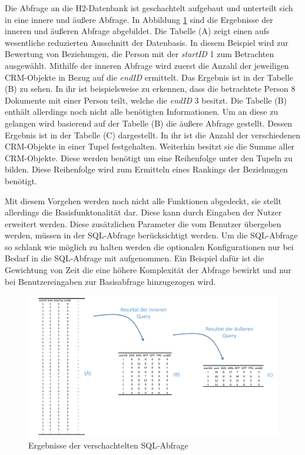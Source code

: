 Die Abfrage an die H2-Datenbank ist geschachtelt aufgebaut und unterteilt sich in eine innere und äußere Abfrage. In Abbildung \ref{umsetzung_sql} sind die Ergebnisse der inneren und äußeren Abfrage abgebildet. Die Tabelle (A) zeigt einen aufs wesentliche reduzierten Ausschnitt der Datenbasis. In diesem Beispiel wird zur Bewertung von Beziehungen, die Person mit der \textit{startID} 1 zum Betrachten ausgewählt. Mithilfe der inneren Abfrage wird zuerst die Anzahl der jeweiligen CRM-Objekte in Bezug auf die \textit{endID} ermittelt. Das Ergebnis ist in der Tabelle (B) zu sehen. In ihr ist beispielsweise zu erkennen, dass die betrachtete Person 8 Dokumente mit einer Person teilt, welche die \textit{endID} 3 besitzt. Die Tabelle (B) enthält allerdings noch nicht alle benötigten Informationen. Um an diese zu gelangen wird basierend auf der Tabelle (B)  die äußere Abfrage gestellt. Dessen Ergebnis ist in der Tabelle (C) dargestellt. In ihr ist die Anzahl der verschiedenen CRM-Objekte in einer Tupel festgehalten. Weiterhin besitzt sie die Summe aller CRM-Objekte. Diese werden benötigt um eine Reihenfolge unter den Tupeln zu bilden. Diese Reihenfolge wird zum Ermitteln eines Rankings der Beziehungen benötigt.

Mit diesem Vorgehen werden noch nicht alle Funktionen abgedeckt, sie stellt allerdings die Basisfunktonalität dar. Diese kann durch Eingaben der Nutzer erweitert werden. Diese zusätzlichen Parameter die vom Benutzer übergeben werden, müssen in der SQL-Abfrage berücksichtigt werden. Um die SQL-Abfrage so schlank wie möglich zu halten werden die optionalen Konfigurationen nur bei Bedarf in die SQL-Abfrage mit aufgenommen. Ein Beispiel dafür ist die Gewichtung von Zeit die eine höhere Komplexität der Abfrage bewirkt und nur bei Benutzereingaben zur Basisabfrage hinzugezogen wird.


\begin{figure}[htbp]
\centering
  \includegraphics[width=1.0\textwidth]{pics/sql_abfrage.pdf}
\caption{Ergebnisse der verschachtelten SQL-Abfrage}
\label{umsetzung_sql}
\end{figure}

